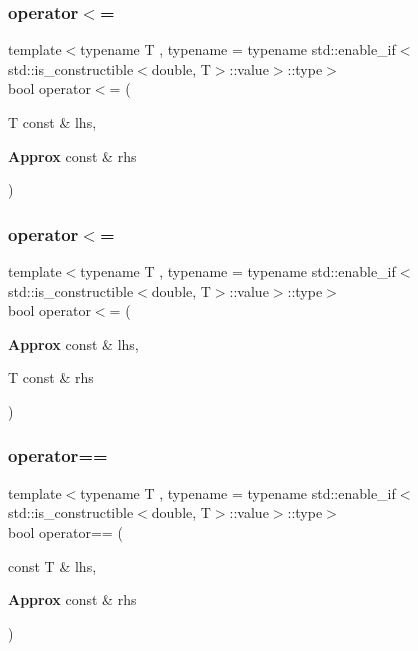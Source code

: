 \subsubsection{operator$<$=\hspace{0.1cm}{\footnotesize\ttfamily [1/2]}}
{\footnotesize\ttfamily template$<$typename T , typename  = typename std\+::enable\+\_\+if$<$std\+::is\+\_\+constructible$<$double, T$>$\+::value$>$\+::type$>$ \\
bool operator$<$= (\begin{DoxyParamCaption}\item[{T const \&}]{lhs,  }\item[{\textbf{ Approx} const \&}]{rhs }\end{DoxyParamCaption})\hspace{0.3cm}{\ttfamily [friend]}}

\mbox{\label{class_catch_1_1_detail_1_1_approx_a6040b908588745570847d7ae8483b091}} 
\subsubsection{operator$<$=\hspace{0.1cm}{\footnotesize\ttfamily [2/2]}}
{\footnotesize\ttfamily template$<$typename T , typename  = typename std\+::enable\+\_\+if$<$std\+::is\+\_\+constructible$<$double, T$>$\+::value$>$\+::type$>$ \\
bool operator$<$= (\begin{DoxyParamCaption}\item[{\textbf{ Approx} const \&}]{lhs,  }\item[{T const \&}]{rhs }\end{DoxyParamCaption})\hspace{0.3cm}{\ttfamily [friend]}}

\mbox{\label{class_catch_1_1_detail_1_1_approx_ab38782a37d09b527ca5e126dbf433dda}} 
\subsubsection{operator==\hspace{0.1cm}{\footnotesize\ttfamily [1/2]}}
{\footnotesize\ttfamily template$<$typename T , typename  = typename std\+::enable\+\_\+if$<$std\+::is\+\_\+constructible$<$double, T$>$\+::value$>$\+::type$>$ \\
bool operator== (\begin{DoxyParamCaption}\item[{const T \&}]{lhs,  }\item[{\textbf{ Approx} const \&}]{rhs }\end{DoxyParamCaption})\hspace{0.3cm}{\ttfamily [friend]}}

